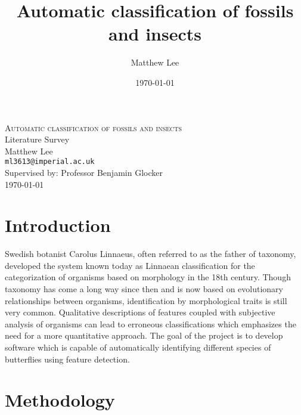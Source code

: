 \documentclass[11pt, titlepage, oneside]{article}
\title{Automatic classification of fossils and insects}
\author{Matthew Lee}
\date{\today}
\theoremstyle{plain}
\theoremstyle{definition}
\theoremstyle{remark}
\begin{document}
\begin{minipage}[b]{\linewidth}
	\center
	\textsc{\Large Automatic classification of fossils and insects}\\
	\vspace{1.0cm}
	\Large Literature Survey \\
	\vspace{1.0cm}
	\normalsize Matthew Lee\\
	\normalsize \texttt{ml3613@imperial.ac.uk}\\
	\normalsize Supervised by: Professor Benjamin Glocker\\
	\vspace{0.35cm}
\today
\end{minipage}

\hspace{0.375cm}

\tableofcontents

\section{Introduction}
	Swedish botanist Carolus Linnaeus, often referred to as the father of taxonomy, developed the system known today as Linnaean classification for the categorization of organisms  based on morphology in the 18th century. Though taxonomy has come a long way since then and is now based on evolutionary relationships between organisms, identification by morphological traits is still very common. Qualitative descriptions of features coupled with subjective analysis of organisms can lead to erroneous classifications\cite[p.~154]{nature} which emphasizes the need for a more quantitative approach. The goal of the project is to develop software which is capable of automatically identifying different species of butterflies using feature detection.  
\section{Methodology}
	
\end{document}
